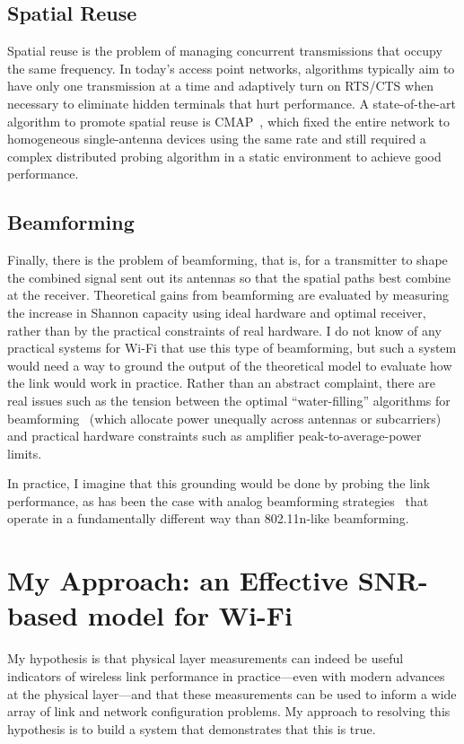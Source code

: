 \subsection{Spatial Reuse}
Spatial reuse is the problem of managing concurrent transmissions that occupy the same frequency. In today's access point networks, algorithms typically aim to have only one transmission at a time and adaptively turn on RTS/CTS when necessary to eliminate hidden terminals that hurt performance. A state-of-the-art algorithm to promote spatial reuse is CMAP~\cite{Vutukuru_CMAP}, which fixed the entire network to homogeneous single-antenna devices using the same rate and still required a complex distributed probing algorithm in a static environment to achieve good performance.

\subsection{Beamforming}
Finally, there is the problem of beamforming, that is, for a transmitter to shape the combined signal sent out its antennas so that the spatial paths best combine at the receiver. Theoretical gains from beamforming are evaluated by measuring the increase in Shannon capacity using ideal hardware and optimal receiver, rather than by the practical constraints of real hardware. I do not know of any practical systems for Wi-Fi that use this type of beamforming, but such a system would need a way to ground the output of the theoretical model to evaluate how the link would work in practice. Rather than an abstract complaint, there are real issues such as the tension between the optimal ``water-filling'' algorithms for beamforming~\cite{Tse} (which allocate power unequally across antennas or subcarriers) and practical hardware constraints such as amplifier peak-to-average-power limits.

In practice, I imagine that this grounding would be done by probing the link performance, as has been the case with analog beamforming strategies~\cite{Liu_DIRC} that operate in a fundamentally different way than 802.11n-like beamforming.

\section{My Approach: an Effective SNR-based model for Wi-Fi}
My hypothesis is that physical layer measurements can indeed be useful indicators of wireless link performance in practice---even with modern advances at the physical layer---and that these measurements can be used to inform a wide array of link and network configuration problems. My approach to resolving this hypothesis is to build a system that demonstrates that this is true.

